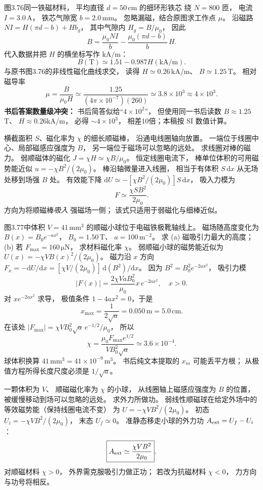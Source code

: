 图3.76同一铁磁材料，
平均直径
$d=50\,\mathrm{cm}$ 的细环形铁芯
绕 $N=800$ 匝，
电流 $I=3.0\,\mathrm A$，
铁芯气隙宽
$b=2.0\,\mathrm{mm}$。
忽略漏磁，结合原图求工作点 $\mu$。
\exsolution
沿磁路
$NI=H(\pi d-b)+Hb_g$，
其中气隙内
$H_g=B/\mu_0$，
因此
\[
B=\frac{\mu_0NI}{b}
-\frac{\mu_0(\pi d-b)}{b}\,H.
\]
代入数据并把 $H$ 的横坐标写作
$\mathrm{kA/m}$：
\[
\boxed{B(\mathrm T)\simeq
1.51-0.987H(\mathrm{kA/m})}.
\]
与原书图3.76的非线性磁化曲线求交，
读得
$H\simeq0.26\,\mathrm{kA/m}$、
$B\simeq1.25\,\mathrm T$。
相对磁导率
\[
\boxed{\mu=\frac B{\mu_0H}
\simeq\frac{1.25}
{(4\pi\times10^{-7})(260)}
\simeq3.8\times10^3\approx4\times10^3}.
\]
\excheck \textbf{书后答案数量级冲突：}
书后简答似给“$4\times10^2$”，
但使用同一书后读数 $B\approx1.25$T、
$H\approx0.26$kA/m，
必得 $\sim4\times10^3$，
相差10倍；本稿按 SI 数值计算。

横截面积 $S$、磁化率为 $\chi$
的细长顺磁棒，
沿通电线圈轴向放置。
一端位于线圈中心、局部磁感应强度为 $B$，
另一端位于磁场可以忽略的远处。
求线圈对棒的磁力。
\exsolution
弱顺磁体的磁化
$J=\chi H\simeq\chi B/\mu_0$。
恒定线圈电流下，
棒单位体积的可用磁势能近似
$u=-\chi B^2/(2\mu_0)$。
棒沿轴微量进入线圈，
相当于有体积 $S\,\mathrm dx$
从无场处移到场强 $B$ 处。
有效能下降
$\mathrm dU\simeq
-[\chi B^2/(2\mu_0)]S\,\mathrm dx$，
吸入力模为
\[
\boxed{F\simeq\frac{\chi SB^2}{2\mu_0}}.
\]
\excheck 方向为将顺磁棒\emph{吸入}
强磁场一侧；
该式只适用于弱磁化与细棒近似。

图3.77中体积
$V=41\,\mathrm{mm^3}$
的顺磁小球位于电磁铁极靴轴线上。
磁场随高度变化为
$B(x)=B_0e^{-a x^2}$，
$B_0=1.50\,\mathrm T$、
$a=100\,\mathrm{m^{-2}}$。
求 (a) 磁吸引力最大的高度；
(b) 若 $F_{\max}=160\,\mathrm{\mu N}$，
求材料磁化率 $\chi$。
\exsolution
弱顺磁小球的磁势能近似为
$U(x)=-\chi VB(x)^2/(2\mu_0)$。
磁力沿 $x$ 方向
$F_x=-\mathrm dU/\mathrm dx
=[\chi V/(2\mu_0)]\,\mathrm d(B^2)/\mathrm dx$。
因为
$B^2=B_0^2e^{-2ax^2}$，
吸引力模
\[
|F(x)|=\frac{2\chi Va B_0^2}{\mu_0}
x\,e^{-2ax^2},\quad x>0.
\]
对 $x e^{-2ax^2}$ 求导，
极值条件
$1-4ax^2=0$，于是
\[
\boxed{x_{\max}=\frac1{2\sqrt a}
=0.050\,\mathrm m=5.0\,\mathrm{cm}}.
\]
在该处
$|F_{\max}|=
\chi VB_0^2\sqrt a\,e^{-1/2}/\mu_0$，
所以
\[
\boxed{\chi=
\frac{\mu_0F_{\max}e^{1/2}}
{VB_0^2\sqrt a}
\simeq3.6\times10^{-4}}.
\]
\excheck 球体积换算
$41\,\mathrm{mm^3}=41\times10^{-9}\,\mathrm{m^3}$。
书后纯文本提取的 $x_m$ 可能丢平方根；
从极值方程所得长度尺度必须是 $1/\sqrt a$。

一颗体积为 $V$、
顺磁磁化率为 $\chi$ 的小球，
从线圈轴上磁感应强度为 $B$ 的位置，
被缓慢移动到场可以忽略的远处。
求外力所做功。
\exsolution
弱线性顺磁球在给定外场中的
等效磁势能（保持线圈电流不变）
为
$U=-\chi VB^2/(2\mu_0)$。
初态
$U_i=-\chi VB^2/(2\mu_0)$，
末态
$U_f\simeq0$。
准静态移走小球的外力功
$A_{\rm ext}=U_f-U_i$：
\[
\boxed{A_{\rm ext}\simeq
\frac{\chi VB^2}{2\mu_0}}.
\]
\excheck 对顺磁材料 $\chi>0$，
外界需克服吸引力做正功；
若改为抗磁材料 $\chi<0$，
力方向与功号将相反。
